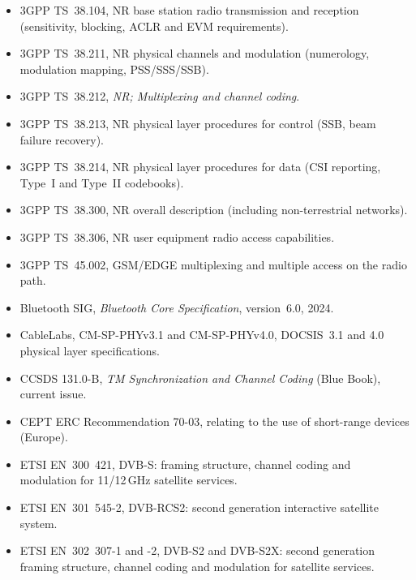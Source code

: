 \begin{itemize}[leftmargin=1.5em,itemindent=-1.5em,itemsep=1.5pt plus 1pt,parsep=0pt,topsep=4pt,label={}]
\item 3GPP TS~38.104, NR base station radio transmission and reception (sensitivity, blocking, ACLR and EVM requirements).
\item 3GPP TS~38.211, NR physical channels and modulation (numerology, modulation mapping, PSS/SSS/SSB).
\item 3GPP TS~38.212, \emph{NR; Multiplexing and channel coding}.
\item 3GPP TS~38.213, NR physical layer procedures for control (SSB, beam failure recovery).
\item 3GPP TS~38.214, NR physical layer procedures for data (CSI reporting, Type~I and Type~II codebooks).
\item 3GPP TS~38.300, NR overall description (including non-terrestrial networks).
\item 3GPP TS~38.306, NR user equipment radio access capabilities.
\item 3GPP TS~45.002, GSM/EDGE multiplexing and multiple access on the radio path.
\item Bluetooth SIG, \emph{Bluetooth Core Specification}, version~6.0, 2024.
\item CableLabs, CM-SP-PHYv3.1 and CM-SP-PHYv4.0, DOCSIS~3.1 and 4.0 physical layer specifications.
\item CCSDS 131.0-B, \emph{TM Synchronization and Channel Coding} (Blue Book), current issue.
\item CEPT ERC Recommendation 70-03, relating to the use of short-range devices (Europe).
\item ETSI EN~300~421, DVB-S: framing structure, channel coding and modulation for 11/12\,GHz satellite services.
\item ETSI EN~301~545-2, DVB-RCS2: second generation interactive satellite system.
\item ETSI EN~302~307-1 and -2, DVB-S2 and DVB-S2X: second generation framing structure, channel coding and modulation for satellite services.

\end{itemize}
